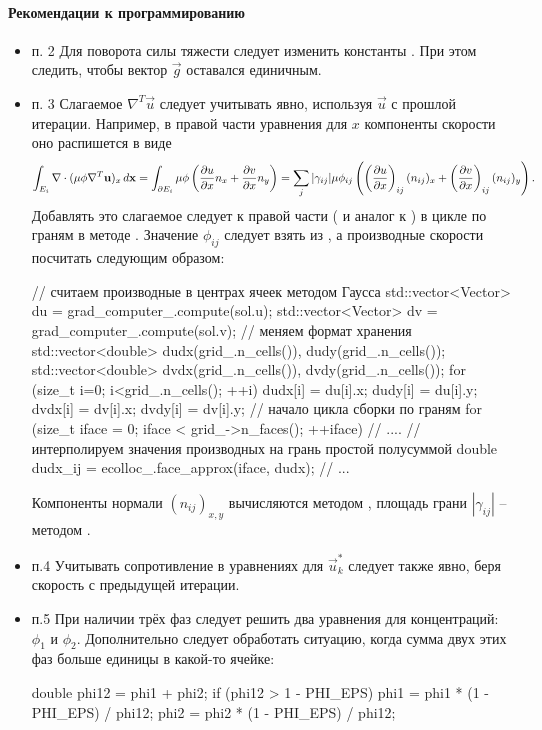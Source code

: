 \paragraph{Рекомендации к программированию}
\begin{itemize}
\item п. 2
Для поворота силы тяжести следует изменить константы . При этом следить, чтобы вектор $\vec g$ оставался единичным.
\item п. 3
Слагаемое $\nabla^T \vec u$ следует учитывать явно, используя $\vec u$ с прошлой итерации.
Например, в правой части уравнения для $x$ компоненты скорости оно распишется в виде
\begin{equation*}
\int_{E_i} \nabla\cdot(\mu \phi \nabla^T \boldsymbol{\rm u})_x \, d\boldsymbol{\rm x} = 
\int_{\partial E_i} \mu \phi \left(\frac{\partial u}{\partial x} n_x + \frac{\partial v}{\partial x} n_y\right) =
\sum_j |\gamma_{ij}| \mu \phi_{ij}\left( \left(\frac{\partial u}{\partial x}\right)_{ij} (n_{ij})_x + \left(\frac{\partial v}{\partial x}\right)_{ij} (n_{ij})_y \right).
\end{equation*}
Добавлять это слагаемое следует к правой части ( и аналог к )
в цикле по граням в методе .
Значение $\phi_{ij}$ следует взять из ,
а производные скорости посчитать следующим образом:
\begin{cppcode}
// считаем производные в центрах ячеек методом Гаусса
std::vector<Vector> du = grad_computer_.compute(sol.u);
std::vector<Vector> dv = grad_computer_.compute(sol.v);
// меняем формат хранения
std::vector<double> dudx(grid_.n_cells()), dudy(grid_.n_cells());
std::vector<double> dvdx(grid_.n_cells()), dvdy(grid_.n_cells());
for (size_t i=0; i<grid_.n_cells(); ++i){
    dudx[i] = du[i].x;
    dudy[i] = du[i].y;
    dvdx[i] = dv[i].x;
    dvdy[i] = dv[i].y;
}
// начало цикла сборки по граням
for (size_t iface = 0; iface < grid_->n_faces(); ++iface) {
    // ....
    // интерполируем значения производных на грань простой полусуммой
    double dudx_ij = ecolloc_.face_approx(iface, dudx);
    // ...
}
\end{cppcode}
Компоненты нормали $(n_{ij})_{x,y}$ вычисляются методом ,
площадь грани $|\gamma_{ij}|$ -- методом .
\item п.4 Учитывать сопротивление в уравнениях для $\vec u^*_k$ следует также явно, беря скорость с предыдущей итерации.
\item п.5 При наличии трёх фаз следует решить два уравнения для концентраций: $\phi_1$ и $\phi_2$.
Дополнительно следует обработать ситуацию, когда сумма двух этих фаз больше единицы в какой-то ячейке:
\begin{cppcode}
double phi12 = phi1 + phi2;
if (phi12 > 1 - PHI_EPS){
    phi1 = phi1 * (1 - PHI_EPS) / phi12;
    phi2 = phi2 * (1 - PHI_EPS) / phi12;
}
\end{cppcode}

\end{itemize}
